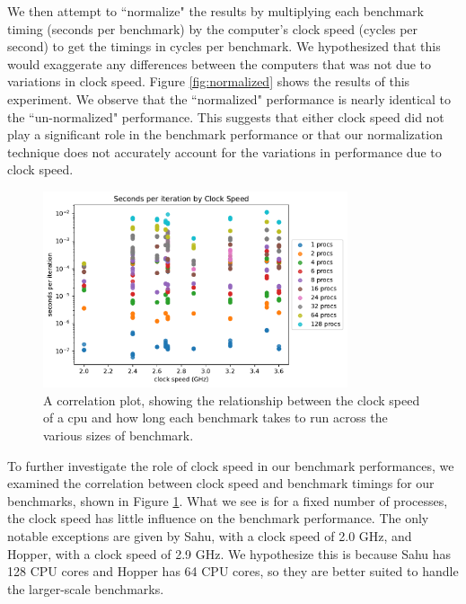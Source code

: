 \documentclass{article}
\begin{document}
We then attempt to ``normalize" the results by multiplying each benchmark timing (seconds per benchmark) by the computer's clock speed (cycles per second) to get the timings in cycles per benchmark. We hypothesized that this would exaggerate any differences between the computers that was not due to variations in clock speed. Figure \ref{fig:normalized} shows the results of this experiment. We observe that the ``normalized" performance is nearly identical to the ``un-normalized" performance. This suggests that either clock speed did not play a significant role in the benchmark performance or that our normalization technique does not accurately account for the variations in performance due to clock speed.

\begin{figure}[h!]
    \centering
    \includegraphics[width=0.8\textwidth]{figures/final/correlation.pdf}
    \caption{A correlation plot, showing the relationship between the clock speed of a cpu and how long each benchmark takes to run across the various sizes of benchmark. }
    \label{fig:correlation}
\end{figure}

To further investigate the role of clock speed in our benchmark performances, we examined the correlation between clock speed and benchmark timings for our benchmarks, shown in Figure \ref{fig:correlation}. What we see is for a fixed number of processes, the clock speed has little influence on the benchmark performance. The only notable exceptions are given by Sahu, with a clock speed of 2.0 GHz, and Hopper, with a clock speed of 2.9 GHz. We hypothesize this is because Sahu has 128 CPU cores and Hopper has 64 CPU cores, so they are better suited to handle the larger-scale benchmarks.
\end{document}
